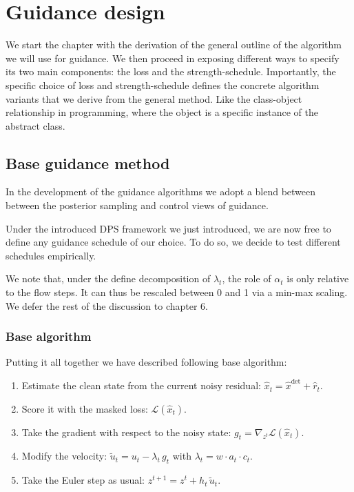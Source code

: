 \chapter{Guidance design}\label{ch:guide}

We start the chapter with the derivation of the general outline of the algorithm we will use for guidance.
We then proceed in exposing different ways to specify its two main components: the loss and the strength-schedule.
Importantly, the specific choice of loss and strength-schedule defines the concrete algorithm variants that we derive from the general method.
Like the class-object relationship in programming, where the object is a specific instance of the abstract class.

\section{Base guidance method}

In the development of the guidance algorithms we adopt a blend between between the posterior sampling and control views of guidance.

Under the introduced DPS framework we just introduced, we are now free to define any guidance schedule of our choice.
To do so, we decide to test different schedules empirically.

We note that, under the define decomposition of $\lambda_t$, the role of $\alpha_t$ is only relative to the flow steps.
It can thus be rescaled between 0 and 1 via a min-max scaling.
We defer the rest of the discussion to chapter 6.

\subsection{Base algorithm}

Putting it all together we have described following base algorithm:
\begin{enumerate}[noitemsep]
  \item Estimate the clean state from the current noisy residual: $\hat{x}_t = \hat{x}^{\text{det}} + \hat{r}_t$.
  \item Score it with the masked loss: $\mathcal{L}(\hat{x}_t)$.
  \item Take the gradient with respect to the noisy state: $g_t = \nabla_{z^{t}} \mathcal{L}(\hat{x}_t)$.
  \item Modify the velocity: $\tilde{u}_t = u_t - \lambda_t\, g_t$ with $\lambda_t = w \cdot a_t \cdot c_t$.
  \item Take the Euler step as usual: $z^{t+1} = z^{t} + h_t\, \tilde{u}_t$.
\end{enumerate}

